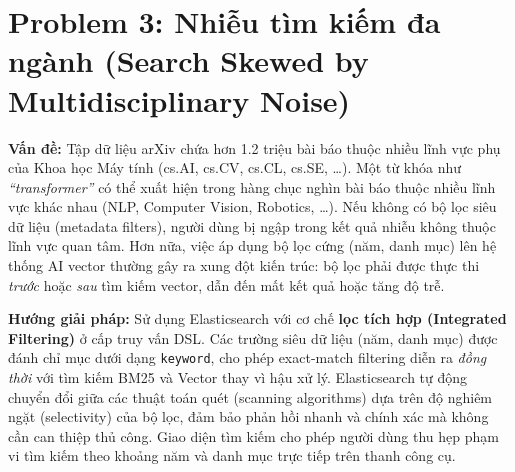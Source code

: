 \section{Problem 3: Nhiễu tìm kiếm đa ngành (Search Skewed by Multidisciplinary Noise)}
\textbf{Vấn đề:} Tập dữ liệu arXiv chứa hơn 1.2 triệu bài báo thuộc nhiều lĩnh vực phụ của Khoa học Máy tính (cs.AI, cs.CV, cs.CL, cs.SE, \ldots). Một từ khóa như \textit{``transformer''} có thể xuất hiện trong hàng chục nghìn bài báo thuộc nhiều lĩnh vực khác nhau (NLP, Computer Vision, Robotics, \ldots). Nếu không có bộ lọc siêu dữ liệu (metadata filters), người dùng bị ngập trong kết quả nhiễu không thuộc lĩnh vực quan tâm. Hơn nữa, việc áp dụng bộ lọc cứng (năm, danh mục) lên hệ thống AI vector thường gây ra xung đột kiến trúc: bộ lọc phải được thực thi \textit{trước} hoặc \textit{sau} tìm kiếm vector, dẫn đến mất kết quả hoặc tăng độ trễ.

\textbf{Hướng giải pháp:} Sử dụng Elasticsearch với cơ chế \textbf{lọc tích hợp (Integrated Filtering)} ở cấp truy vấn DSL. Các trường siêu dữ liệu (năm, danh mục) được đánh chỉ mục dưới dạng \texttt{keyword}, cho phép exact-match filtering diễn ra \textit{đồng thời} với tìm kiếm BM25 và Vector thay vì hậu xử lý. Elasticsearch tự động chuyển đổi giữa các thuật toán quét (scanning algorithms) dựa trên độ nghiêm ngặt (selectivity) của bộ lọc, đảm bảo phản hồi nhanh và chính xác mà không cần can thiệp thủ công. Giao diện tìm kiếm cho phép người dùng thu hẹp phạm vi tìm kiếm theo khoảng năm và danh mục trực tiếp trên thanh công cụ.